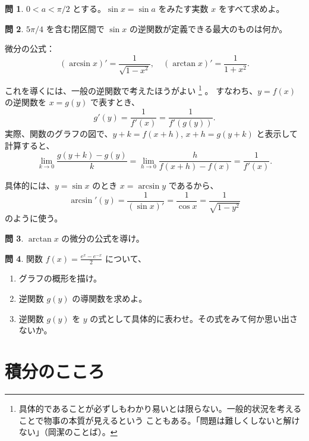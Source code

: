 \documentclass[a4paper]{jsarticle}
\theoremstyle{definition}
\newtheorem{Exercise}{問}%
\theoremstyle{remark}
\begin{document}
\begin{Exercise}
$0 < a < \pi/2$ とする。$\sin x = \sin a$ をみたす実数 $x$ をすべて求めよ。
\end{Exercise}

\begin{Exercise}
$5\pi/4$ を含む閉区間で $\sin x$ の逆関数が定義できる最大のものは何か。
\end{Exercise}

\bigskip
微分の公式：
\[
(\arcsin x)' = \dfrac{1}{\sqrt{1-x^2}},\quad
(\arctan x)' = \dfrac{1}{1+x^2}.
\]
\par
これを導くには、一般の逆関数で考えたほうがよい
\footnote{具体的であることが必ずしもわかり易いとは限らない。一般的状況を考えることで物事の本質が見えるという
こともある。「問題は難しくしないと解けない」（岡潔のことば）。} 。
すなわち、$y = f(x)$ の逆関数を $x = g(y)$  で表すとき、
\[
g'(y) = \frac{1}{f'(x)} = \frac{1}{f'(g(y))}.
\]
実際、関数のグラフの図で、$y+k = f(x+h)$, $x+h = g(y+k)$ と表示して計算すると、
\[
\lim_{k\to 0} \frac{g(y+k) - g(y)}{k} =
\lim_{h\to 0} \frac{h}{f(x+h) - f(x)} = \frac{1}{f'(x)}.
\]

具体的には、$y = \sin x$ のとき $x = \arcsin y$ であるから、
\[
\arcsin'(y) = \frac{1}{(\sin x)'} 
= \frac{1}{\cos x}
= \frac{1}{\sqrt{1 - y^2}}
\]
のように使う。

\begin{Exercise}
$\arctan x$ の微分の公式を導け。
\end{Exercise}

\begin{Exercise}
関数 $f(x) = \frac{e^x - e^{-x}}{2}$ について、
\begin{enumerate}
\item 
グラフの概形を描け。
\item 逆関数 $g(y)$ の導関数を求めよ。
\item 
逆関数 $g(y)$ を $y$ の式として具体的に表わせ。その式をみて何か思い出さないか。
\end{enumerate}
\end{Exercise}

\bigskip
\bigskip
\section{積分のこころ}

\end{document}
